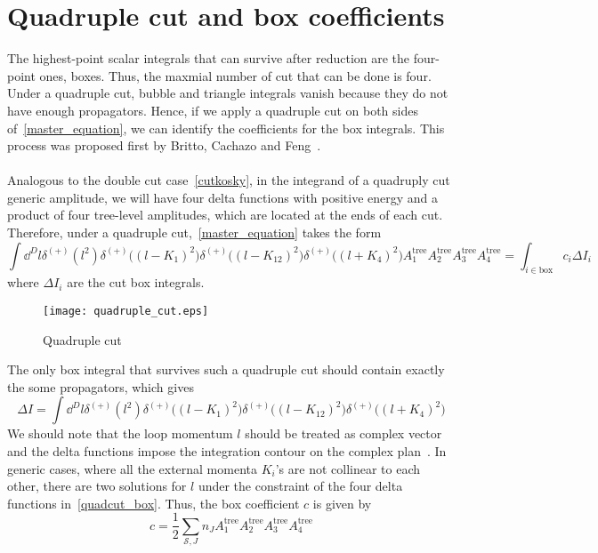 \section{Quadruple cut and box coefficients}\label{sect-quadcut}
The highest-point scalar integrals that can survive after reduction are the four-point ones, \ie boxes. 
Thus, the maxmial number of cut that can be done is four. 
Under a quadruple cut, bubble and triangle integrals vanish because they do not have enough propagators.
Hence, if we apply a quadruple cut on both sides of~\cref{master_equation}, we can identify the coefficients for the box integrals.
This process was proposed first by Britto, Cachazo and Feng~\cite{Britto:2004nc}.
\\\\
Analogous to the double cut case~\cref{cutkosky}, in the integrand of a quadruply cut generic amplitude, we will have four delta functions with positive energy and a product of four tree-level amplitudes, which are located at the ends of each cut. 
Therefore, under a quadruple cut,~\cref{master_equation} takes the form
\begin{equation}
\int\dd^D l \delta^{(+)}(l^2) \delta^{(+)}\big((l-K_1)^2\big)
\delta^{(+)}\big((l-K_{12})^2\big)
\delta^{(+)}\big((l+K_4)^2\big)
A_1^{\mathrm{tree}}A_2^{\mathrm{tree}}A_3^{\mathrm{tree}}A_4^{\mathrm{tree}}=
\int_{i\in\mathrm{box}} c_i \Delta I_i
\end{equation}
where $\Delta I_i$ are the cut box integrals.
\begin{figure}[h]
  \centering
  \texttt{[image: quadruple\_cut.eps]}
  \caption{Quadruple cut}
  \label{fig-quadruple_cut}
\end{figure}
The only box integral that survives such a quadruple cut should contain exactly the some propagators, which gives
\begin{equation}\label{quadcut_box}
\Delta I = \int \dd^D l \delta^{(+)}(l^2) \delta^{(+)}\big((l-K_1)^2\big)\delta^{(+)}\big((l-K_{12})^2\big)
\delta^{(+)}\big((l+K_4)^2\big)
\end{equation}
We should note that the loop momentum $l$ should be treated as complex vector and the delta functions impose the integration contour on the complex plan~\cite{PhysRevD.75.025028, Kosower:2011ty}.
In generic cases, where all the external momenta $K_i$'s are not collinear to each other, 
there are two solutions for $l$ under the constraint of the four delta functions in~\cref{quadcut_box}. 
Thus, the box coefficient $c$ is given by
\begin{equation}\label{box_coeff}
c = \frac{1}{2}\sum_{\mathcal{S}, J}n_J A_1^{\mathrm{tree}}A_2^{\mathrm{tree}}A_3^{\mathrm{tree}}A_4^{\mathrm{tree}}
\end{equation}
